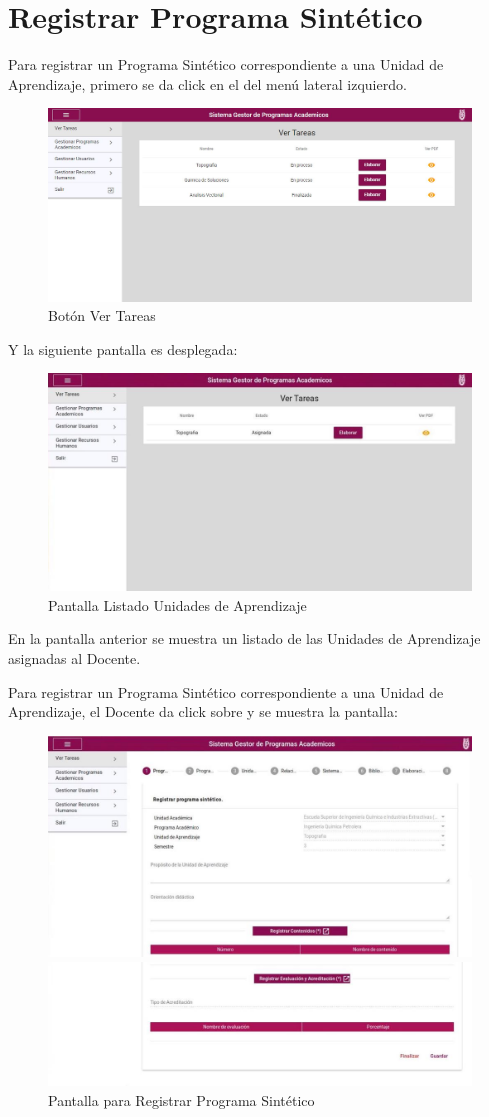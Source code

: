 \section{Registrar Programa Sintético}
Para registrar un Programa Sintético correspondiente a una Unidad de Aprendizaje, primero se da click en el  del menú lateral izquierdo.

\begin{figure}[!hbtp]
    \centering
    \includegraphics[width=0.4\linewidth]{images/SP6/VTA}
    \caption{Botón Ver Tareas} 
\end{figure}

Y la siguiente pantalla es desplegada:

\begin{figure}[H]
    \centering
    \hypertarget{RegLUA}{\includegraphics[width=0.7\linewidth]{images/SP6/PSListado.jpeg}}
    \caption{Pantalla Listado Unidades de Aprendizaje} 
\end{figure}

En la pantalla anterior se muestra un listado de las Unidades de Aprendizaje asignadas al Docente.

Para registrar un Programa Sintético correspondiente a una Unidad de Aprendizaje, el Docente da click sobre  y se muestra la pantalla:


\begin{figure}[H]
    \centering
    \hypertarget{RegPS}{\includegraphics[width=0.7\linewidth]{images/SP6/PSinicio.jpeg}}
    \includegraphics[width=0.7\linewidth]{images/SP6/PSinicio2.jpeg}
    \caption{Pantalla para Registrar Programa Sintético}
\end{figure}

